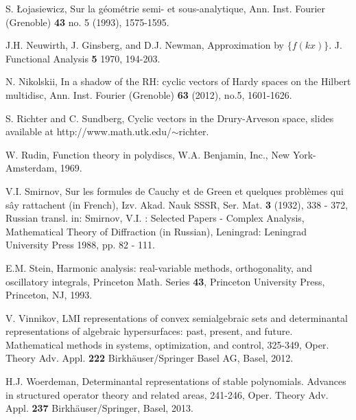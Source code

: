 \documentclass[11 pt,reqno]{amsart}
\theoremstyle{definition}
\theoremstyle{remark}
\numberwithin{equation}{section} \numberwithin{figure}{section}
\begin{document}
\begin{thebibliography}{1}
S. \L ojasiewicz, Sur la g\'eom\'etrie semi- et sous-analytique, Ann. Inst. Fourier (Grenoble) {\bf 43} no. 5 (1993), 1575-1595.

 J.H. Neuwirth, J. Ginsberg, and D.J. Newman,
  Approximation by $\{f(kx)\}$. J. Functional Analysis {\bf 5} 1970, 194-203.

 N. Nikolskii, In a shadow of the RH: cyclic
  vectors of Hardy spaces on the Hilbert multidisc, Ann. Inst. Fourier
  (Grenoble) {\bf 63} (2012), no.5, 1601-1626.

S. Richter and C. Sundberg, Cyclic vectors in the Drury-Arveson space, slides available at http://www.math.utk.edu/$\sim$richter.

W. Rudin, Function theory in polydiscs, W.A. Benjamin, Inc., New York-Amsterdam, 1969.

 V.I. Smirnov, Sur les formules de Cauchy et de
  Green et quelques probl\`emes qui sây rattachent (in French),
  Izv. Akad. Nauk SSSR, Ser. Mat. \textbf{3} (1932), 338 - 372, Russian
  transl. in: Smirnov, V.I. : Selected Papers - Complex Analysis,
  Mathematical Theory of Diffraction (in Russian), Leningrad:
  Leningrad University Press 1988, pp. 82 - 111.

E.M. Stein, Harmonic analysis: real-variable methods, orthogonality, and oscillatory integrals, Princeton Math. Series {\bf 43}, Princeton University Press, Princeton, NJ, 1993.

 V. Vinnikov, LMI representations of convex
  semialgebraic sets and determinantal representations of algebraic
  hypersurfaces: past, present, and future. Mathematical methods in
  systems, optimization, and control, 325-349, Oper. Theory
  Adv. Appl. \textbf{222} Birkh\"auser/Springer Basel AG, Basel, 2012.

 H.J. Woerdeman, Determinantal representations of stable
  polynomials. Advances in structured operator theory and related
  areas, 241-246, Oper. Theory Adv. Appl. \textbf{237} Birkh\"auser/Springer,
  Basel, 2013.

\end{thebibliography}
\end{document}
